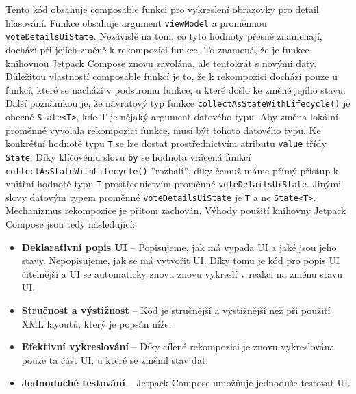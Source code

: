 \noindent Tento kód obsahuje composable funkci pro vykreslení obrazovky pro detail hlasování. Funkce obsahuje argument \lstinline|viewModel| a proměnnou \lstinline|voteDetailsUiState|. Nezávislě na tom, co tyto hodnoty přesně znamenají, dochází při jejich změně k rekompozici funkce. To znamená, že je funkce knihovnou Jetpack Compose znovu zavolána, ale tentokrát s novými daty. Důležitou vlastností composable funkcí je to, že k rekompozici dochází pouze u funkcí, které se nachází v podstromu funkce, u které došlo ke změně jejího stavu. Další poznámkou je, že návratový typ funkce \linebreak \lstinline|collectAsStateWithLifecycle()| je obecně \lstinline|State<T>|, kde T je nějaký argument datového typu. Aby změna lokální proměnné vyvolala rekompozici funkce, musí být tohoto datového typu. Ke konkrétní hodnotě typu \lstinline|T| se lze dostat prostřednictvím atributu \lstinline|value| třídy \lstinline|State|. Díky klíčovému slovu \lstinline|by| se hodnota vrácená funkcí \lstinline|collectAsStateWithLifecycle()| ''rozbalí'', díky čemuž máme přímý přístup k vnitřní hodnotě typu \lstinline|T| prostřednictvím proměnné \lstinline|voteDetailsUiState|. Jinými slovy datovým typem proměnné \lstinline|voteDetailsUiState| je \lstinline|T| a ne \lstinline|State<T>|. Mechanizmus rekompozice je přitom zachován. Výhody použití knihovny Jetpack Compose jsou tedy následující:

\begin{itemize}
	\item \textbf{Deklarativní popis UI} -- Popisujeme, jak má vypada UI a jaké jsou jeho stavy. Nepopisujeme, jak se má vytvořit UI. Díky tomu je kód pro popis UI čitelnější a UI se automaticky znovu znovu vykreslí v reakci na změnu stavu UI.
	
	\item \textbf{Stručnost a výstižnost} -- Kód je stručnější a výstižnější než při použití XML layoutů, který je popsán níže.
	
	\item \textbf{Efektivní vykreslování} -- Díky cílené rekompozici je znovu vykreslována pouze ta část \linebreak UI, u které se změnil stav dat.
	
	\item \textbf{Jednoduché testování} -- Jetpack Compose umožňuje jednoduše testovat UI.
\end{itemize}

